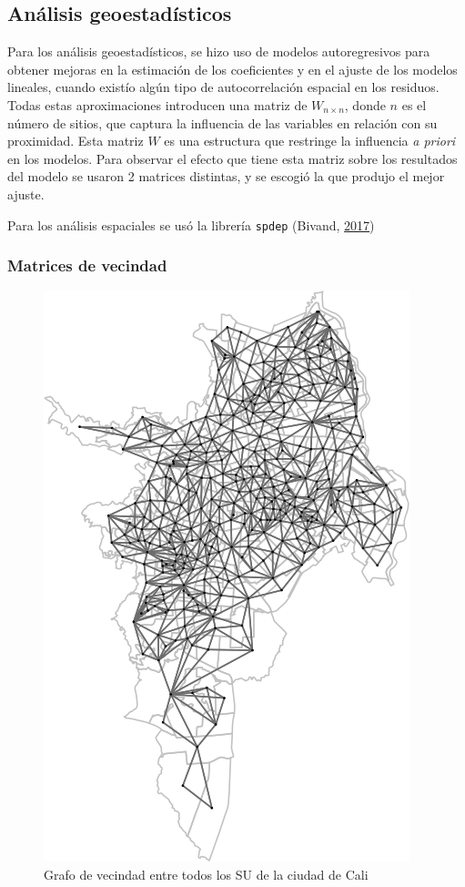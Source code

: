 \documentclass[12pt,a4paper,openany]{book}
\theoremstyle{definition}
\theoremstyle{definition}
\theoremstyle{definition}
\theoremstyle{remark}
\begin{document}
\subsection{Análisis geoestadísticos}\label{geostat}

Para los análisis geoestadísticos, se hizo uso de modelos autoregresivos
para obtener mejoras en la estimación de los coeficientes y en el ajuste
de los modelos lineales, cuando existío algún tipo de autocorrelación
espacial en los residuos. Todas estas aproximaciones introducen una
matriz de \(W_{n \times n}\), donde \(n\) es el número de sitios, que
captura la influencia de las variables en relación con su proximidad.
Esta matriz \(W\) es una estructura que restringe la influencia \emph{a
priori} en los modelos. Para observar el efecto que tiene esta matriz
sobre los resultados del modelo se usaron 2 matrices distintas, y se
escogió la que produjo el mejor ajuste.

Para los análisis espaciales se usó la librería \texttt{spdep} (Bivand,
\protect\hyperlink{ref-R-spdep}{2017})

\subsubsection{Matrices de vecindad}\label{matrices-de-vecindad}

\begin{figure}[H]

{\centering \includegraphics[width=0.6\linewidth]{tesis-unigis_files/figure-latex/w-su-todos-1} 

}

\caption{Grafo de vecindad entre todos los SU de la ciudad de Cali}\label{fig:w-su-todos}
\end{figure}
\end{document}
